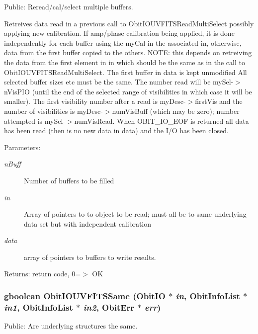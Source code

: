 Public: Reread/cal/select multiple buffers. 

Retreives data read in a previous call to Obit\-IOUVFITSRead\-Multi\-Select possibly applying new calibration. If amp/phase calibration being applied, it is done independently for each buffer using the my\-Cal in the associated in, otherwise, data from the first buffer copied to the others. NOTE: this depends on retreiving the data from the first element in in which should be the same as in the call to Obit\-IOUVFITSRead\-Multi\-Select. The first buffer in data is kept unmodified All selected buffer sizes etc must be the same. The number read will be my\-Sel-$>$n\-Vis\-PIO (until the end of the selected range of visibilities in which case it will be smaller). The first visibility number after a read is my\-Desc-$>$first\-Vis and the number of visibilities is my\-Desc-$>$num\-Vis\-Buff (which may be zero); number attempted is my\-Sel-$>$num\-Vis\-Read. When OBIT\_\-IO\_\-EOF is returned all data has been read (then is no new data in data) and the I/O has been closed. \begin{Desc}
\item[Parameters:]
\begin{description}
\item[{\em n\-Buff}]Number of buffers to be filled \item[{\em in}]Array of pointers to to object to be read; must all be to same underlying data set but with independent calibration \item[{\em data}]array of pointers to buffers to write results. \end{description}
\end{Desc}
\begin{Desc}
\item[Returns:]return code, 0=$>$ OK \end{Desc}
\subsubsection{\setlength{\rightskip}{0pt plus 5cm}gboolean Obit\-IOUVFITSSame ({\bf Obit\-IO} $\ast$ {\em in}, {\bf Obit\-Info\-List} $\ast$ {\em in1}, {\bf Obit\-Info\-List} $\ast$ {\em in2}, {\bf Obit\-Err} $\ast$ {\em err})}\label{ObitIOUVFITS_8c_a20}


Public: Are underlying structures the same. 

